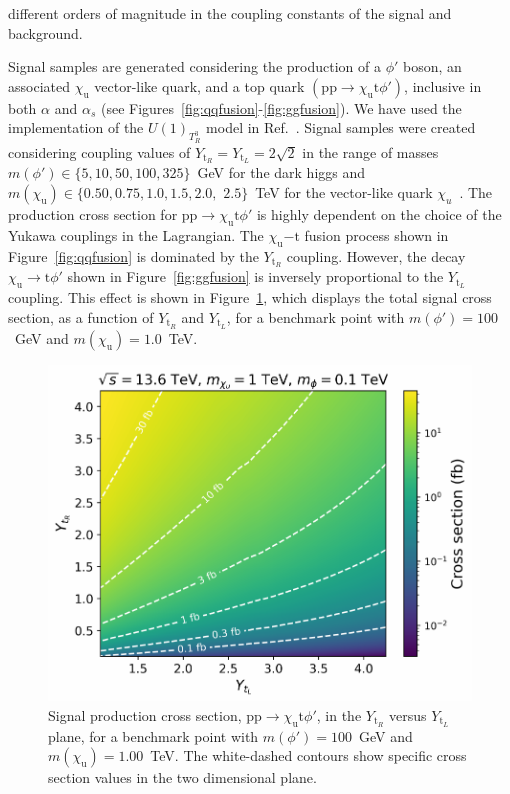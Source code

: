 different orders of magnitude in the coupling constants of the signal and background.

Signal samples are generated considering the production of a $\phi'$ boson, an associated $\chi_\mathrm{u}$ vector-like quark, and a top quark $(\mathrm{pp}\to \chi_\mathrm{u} \mathrm{t} \phi')$, inclusive in both $\alpha$ and $\alpha_s$ (see Figures~\ref{fig:qqfusion}-\ref{fig:ggfusion}). We have used the implementation of the $U(1)_{T^3_R}$ model in Ref.~\parencite{Dutta2023}. Signal samples were created considering coupling values of $Y_{\mathrm{t}_R}=Y_{\mathrm{t}_L}=2\sqrt{2}$ in the range of masses $m(\phi')\in\{5,10,50,100,325\}$~\textrm{GeV} for the dark higgs and $m(\chi_\mathrm{u})\in\{0.50, 0.75, 1.0, 1.5, 2.0, $ $ 2.5\}$~\textrm{TeV} for the vector-like quark $\chi_u$~\parencite{PhysRevD.108.095006}. The production cross section for $\mathrm{pp}\to \chi_\mathrm{u} \mathrm{t} \phi'$ is highly dependent on the choice of the Yukawa couplings in the Lagrangian. The ${\chi_\mathrm{u}}{- \mathrm{t}}$ fusion process shown in Figure~\ref{fig:qqfusion} is dominated by the $Y_{\mathrm{t}_R}$ coupling. However, the decay ${\chi_\mathrm{u}} \to \mathrm{t} \phi'$ shown in Figure~\ref{fig:ggfusion} is inversely proportional to the $Y_{\mathrm{t}_L}$ coupling. This effect is shown in Figure~\ref{fig:cross_section_by_lambdas}, which displays the total signal cross section, as a function of $Y_{\mathrm{t}_R}$ and $Y_{\mathrm{t}_L}$, for a benchmark point with $m(\phi')=100$~\textrm{GeV} and $m(\chi_\mathrm{u})=1.0$~\textrm{TeV}. 

\begin{figure}
    \centering
    \includegraphics[width=0.85\linewidth]{Images/cross_section_by_lambdas.pdf}
    \caption{Signal production cross section, $ \mathrm{pp}\to \chi_\mathrm{u} \mathrm{t} \phi'$,  in the $Y_{\mathrm{t}_R}$ versus $Y_{\mathrm{t}_L}$ plane, for a benchmark point with $m(\phi')=100$~\textrm{GeV} and $m(\chi_\mathrm{u})=1.00$~\textrm{TeV}. The white-dashed contours show specific cross section values in the two dimensional plane.}
    \label{fig:cross_section_by_lambdas}
\end{figure}


